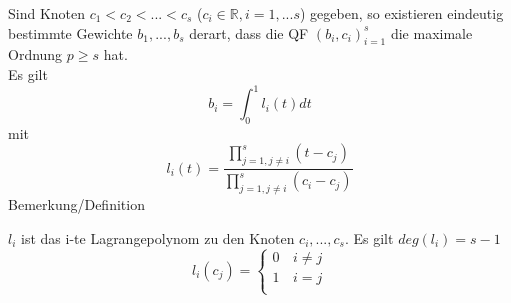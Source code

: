 \begin{theorem}
Sind Knoten $c_1 < c_2 < ... < c_s$ ($c_i \in \mathbb{R}, i = 1,...s$) gegeben, so existieren eindeutig bestimmte Gewichte $b_1 ,..., b_s$ derart, dass die QF $(b_i, c_i)_{i=1}^s$ die maximale Ordnung $p \geq s$ hat. \\
Es gilt $$b_i = \int_0^1 l_i(t) dt$$ mit $$l_i(t) = \frac{\prod_{j=1, j\neq i}^s (t-c_j)}{\prod_{j=1, j\neq i}^s (c_i-c_j)}$$
Bemerkung/Definition
\begin{description}
  \item $l_i$ ist das i-te Lagrangepolynom zu den Knoten $c_i, ...,c_s$. Es gilt $deg(l_i) = s-1$ 
  $$l_i(c_j) = \left\{
\begin{array}{ll}
0 & \,i \neq j \\
1 & \, i = j\\
\end{array}
\right. $$
\end{description}
\end{theorem}
